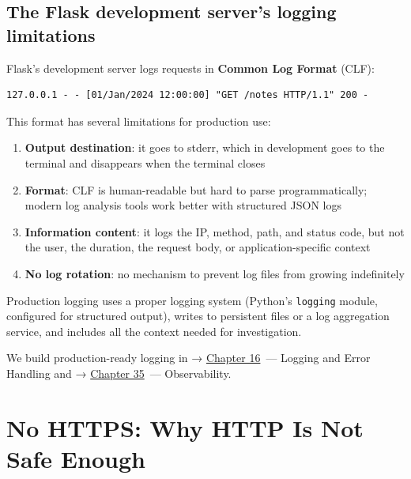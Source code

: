 \subsection*{The Flask development server's logging limitations}\label{11-reliability-security-gaps:the-flask-development-servers-logging-limitations}

Flask's development server logs requests in \textbf{Common Log Format} (CLF):

\begin{outputbox}[short]
\begin{Verbatim}[fontsize=\codesize, breaklines, breakanywhere, breaksymbolleft={\tiny\textcolor{muted}{$\hookrightarrow$}}]
127.0.0.1 - - [01/Jan/2024 12:00:00] "GET /notes HTTP/1.1" 200 -
\end{Verbatim}
\end{outputbox}

\noindent{}This format has several limitations for production use:

\begin{enumerate}
\def\labelenumi{\arabic{enumi}.}
\tightlist
\item
  \textbf{Output destination}: it goes to stderr, which in development goes to the terminal and disappears when the terminal closes
\item
  \textbf{Format}: CLF is human-readable but hard to parse programmatically; modern log analysis tools work better with structured JSON logs
\item
  \textbf{Information content}: it logs the IP, method, path, and status code, but not the user, the duration, the request body, or application-specific context
\item
  \textbf{No log rotation}: no mechanism to prevent log files from growing indefinitely
\end{enumerate}

\noindent{}Production logging uses a proper logging system (Python's \texttt{logging} module, configured for structured output), writes to persistent files or a log aggregation service, and includes all the context needed for investigation.

We build production-ready logging in → \hyperref[ch:16-logging-error-handling]{Chapter 16}~--- Logging and Error Handling and → \hyperref[ch:35-observability]{Chapter 35}~--- Observability.

\setcounter{section}{2}
\section{No HTTPS: Why HTTP Is Not Safe Enough}\label{11-reliability-security-gaps:113-no-https-why-http-is-not-safe-enough}

